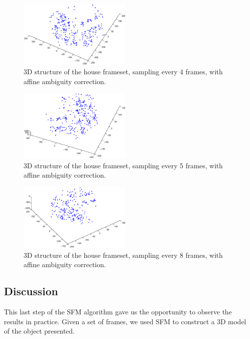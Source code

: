 \begin{figure}[ht!]
  \centering
    \includegraphics[width=0.49\textwidth]{figures/4-11.eps}
    \caption{3D structure of the house frameset, sampling every 4 frames, with affine ambiguity correction.}
    \label{fig:icp4-11}
\end{figure}

\begin{figure}[ht!]
  \centering
    \includegraphics[width=0.49\textwidth]{figures/5-8.eps}
    \caption{3D structure of the house frameset, sampling every 5 frames, with affine ambiguity correction.}
    \label{fig:icp5-8}
\end{figure}

\begin{figure}[ht!]
  \centering
    \includegraphics[width=0.49\textwidth]{figures/8-5.eps}
    \caption{3D structure of the house frameset, sampling every 8 frames, with affine ambiguity correction.}
    \label{fig:icp8-5}
\end{figure}



\subsection{Discussion}
This last step of the SFM algorithm gave us the opportunity to observe the results in practice. Given a set of frames, we used SFM to construct a 3D model of the object presented. 

